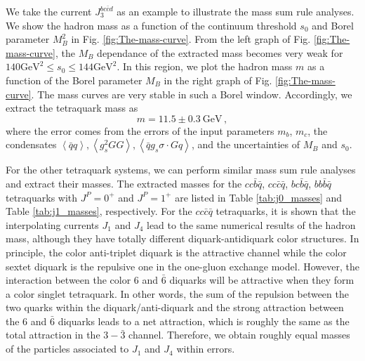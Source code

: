 \documentclass[prd,showpacs,showkeys,floatfix,amsmath,amssymb,floatfix,english]{revtex4}
\begin{document}
We take the current $J_{3}^{bc\bar{c}d}$ as an example to illustrate
the mass sum rule analyses. We show the hadron mass as a function of
the continuum threshold $s_0$ and Borel parameter $M_B^2$ in Fig.
\ref{fig:The-mass-curve}. From the left graph of Fig.
\ref{fig:The-mass-curve}, the $M_{B}$ dependance of the extracted
mass becomes very weak for $140 \mbox{GeV}^{2}\le s_{0}\le 144
\mbox{GeV}^{2}$. In this region, we plot the hadron mass $m$ as a
function of the Borel parameter $M_{B}$ in the right graph of Fig.
\ref{fig:The-mass-curve}. The mass curves are very stable in such a
Borel window. Accordingly, we extract the tetraquark mass as
\begin{equation}
m=11.5\pm0.3~\mathrm{GeV}\, ,
\end{equation}
where the error comes from the errors of the input parameters
$m_{b}$, $m_{c}$, the condensates $\left\langle
\bar{q}q\right\rangle ,\left\langle g_{s}^{2}GG\right\rangle
,\left\langle \bar{q}g_{s}\sigma\cdot Gq\right\rangle $, and the
uncertainties of $M_{B}$ and $s_{0}$.

For the other tetraquark systems, we can perform similar mass sum
rule analyses and extract their masses.
The extracted masses for the $cc\bar{b}\bar{q}$, $cc\bar{c}\bar{q}$,
$bc\bar{b}\bar{q}$, $bb\bar{b}\bar{q}$ tetraquarks with
$J^{P}=0^{+}$ and $J^{P}=1^{+}$ are listed in Table
\ref{tab:j0_masses} and Table \ref{tab:j1_masses}, respectively. 
For the $cc\bar c\bar q$ tetraquarks, it is shown that the interpolating 
currents $J_1$ and $J_4$ lead to the same numerical results of 
the hadron mass, although they have totally different diquark-antidiquark 
color structures. In principle, the color anti-triplet diquark is the attractive 
channel while the color sextet diquark is the repulsive one in the 
one-gluon exchange model. However, the interaction between 
the color $6$ and $\bar 6$ diquarks will be attractive when they 
form a color singlet tetraquark. 
In other words, the sum of the repulsion between the two quarks
within the diquark/anti-diquark and the strong attraction between
the 6 and $\bar 6$ diquarks leads to a net attraction, which is roughly
the same as the total attraction in the $3-\bar 3$ channel. Therefore,
we obtain roughly equal masses of the particles associated to $J_1$
and $J_4$ within errors.
\end{document}
